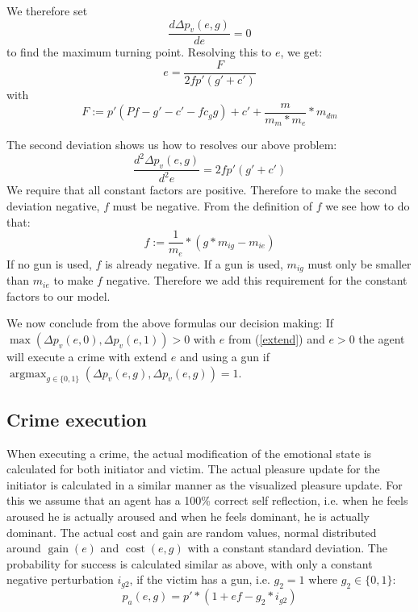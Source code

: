 \documentclass{JASSS}
\DeclareMathOperator{\argmax}{argmax}
\DeclareMathOperator{\cost}{cost}
\DeclareMathOperator{\gain}{gain}
\begin{document}
    We therefore set
    $$ \frac{d\Delta p_v(e,g)}{de} = 0 $$
    to find the maximum turning point.
    Resolving this to $e$, we get:
    \begin{equation} \label{extend}
    	e = \frac{F}{2fp'(g'+c')}
    \end{equation}
    with
    $$
    	F := p'(Pf-g'-c'-fc_gg) + c' + \frac{m}{m_m * m_e}*m_{dm}
    $$

    The second deviation shows us how to resolves our above problem:
    $$ \frac{d^2\Delta p_v(e,g)}{d^2e} = 2fp'(g'+c')$$
    We require that all constant factors are positive. Therefore to make the second deviation negative, $f$ must be negative. From the definition of $f$ we see how to do that:
    $$ f := \frac{1}{m_e}*(g*m_{ig}-m_{ie}) $$
    If no gun is used, $f$ is already negative. If a gun is used, $m_{ig}$ must only be smaller than $m_{ie}$ to make $f$ negative. Therefore we add this requirement for the constant factors to our model.

    We now conclude from the above formulas our decision making:
    If $\max(\Delta p_v(e,0), \Delta p_v(e, 1)) > 0$ with $e$ from (\ref{extend}) and $e > 0$ the agent will execute a crime with extend $e$ and using a gun if $\argmax_{g \in \{0,1\}}(\Delta p_v(e,g), \Delta p_v(e, g)) = 1$.

    \subsection{Crime execution}

    When executing a crime, the actual modification of the emotional state is calculated for both initiator and victim.
    The actual pleasure update for the initiator is calculated in a similar manner as the visualized pleasure update.
    For this we assume that an agent has a 100\% correct self reflection, i.e. when he feels aroused he is actually aroused and when he feels dominant, he is actually dominant.
    The actual cost and gain are random values, normal distributed around $\gain(e)$ and $\cost(e, g)$ with a constant standard deviation.
    The probability for success is calculated similar as above, with only a constant negative perturbation $i_{g2}$, if the victim has a gun, i.e. $g_2 = 1$ where $g_2 \in \{0,1\}$:
    $$ p_a(e,g) = p'*(1+ef - g_2*i_{g2}) $$
\end{document}
